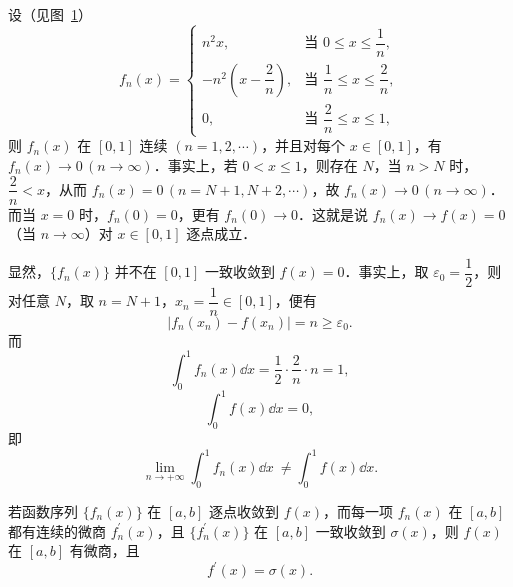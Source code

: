 \begin{example}\label{ex:12-1-8}
设（见图~\ref{fig:12-6}）
\[
f_{n}(x)=\begin{cases}
n^{2}x, & \text{当 }0\leqslant x\leqslant\dfrac{1}{n},\\[5pt]
-n^{2}\left(x-\dfrac{2}{n}\right), & \text{当 }\dfrac{1}{n}\leqslant x\leqslant\dfrac{2}{n},\\[5pt]
0, & \text{当 }\dfrac{2}{n}\leqslant x\leqslant 1,
\end{cases}
\]
则 $f_{n}(x)$ 在 $[0,1]$ 连续 $(n=1,2,\cdots)$，并且对每个 $x\in[0,1]$，有 $f_{n}(x)\to 0\,(n\to\infty)$．事实上，若 $0<x\leqslant 1$，则存在 $N$，当 $n>N$ 时，$\dfrac{2}{n}<x$，从而 $f_{n}(x)$\linebreak${}=0\,(n=N+1,N+2,\cdots)$，故 $f_{n}(x)\to 0\,(n\to\infty)$．而当 $x=0$ 时，$f_{n}(0)=0$，更有 $f_{n}(0)\to 0$．这就是说 $f_{n}(x)\to f(x)=0$（当 $n\to\infty$）对 $x\in[0,1]$ 逐点成立．

\begin{figure}[htbp]
\centering
{}\caption{\relax}\label{fig:12-6}
\end{figure}

显然，$\{f_{n}(x)\}$ 并不在 $[0,1]$ 一致收敛到 $f(x)=0$．事实上，取 $\varepsilon_{0}=\dfrac{1}{2}$，则对任意 $N$，取 $n=N+1$，$x_{n}=\dfrac{1}{n}\in[0,1]$，便有
\[
\left|f_{n}(x_{n})-f(x_{n})\right|=n\geqslant\varepsilon_{0}.
\]
而
\[
\int_{0}^{1}f_{n}(x)\dd x=\frac{1}{2}\cdot\frac{2}{n}\cdot n=1,
\]
\[
\int_{0}^{1}f(x)\dd x=0,
\]
即
\[
\lim_{n\to+\infty}\int_{0}^{1}f_{n}(x)\dd x\ \neq\int_{0}^{1}f(x)\dd x.
\]
\end{example}

\begin{theorem}\label{thm:12-3}
若函数序列 $\{f_{n}(x)\}$ 在 $[a,b]$ 逐点收敛到 $f(x)$，而每一项 $f_{n}(x)$ 在 $[a,b]$ 都有连续的微商 $f_{n}^{\prime}(x)$，且 $\{f_{n}^{\prime}(x)\}$ 在 $[a,b]$ 一致收敛到 $\sigma(x)$，则 $f(x)$ 在 $[a,b]$ 有微商，且
\[
f^{\prime}(x)=\sigma(x).
\]
\end{theorem}

